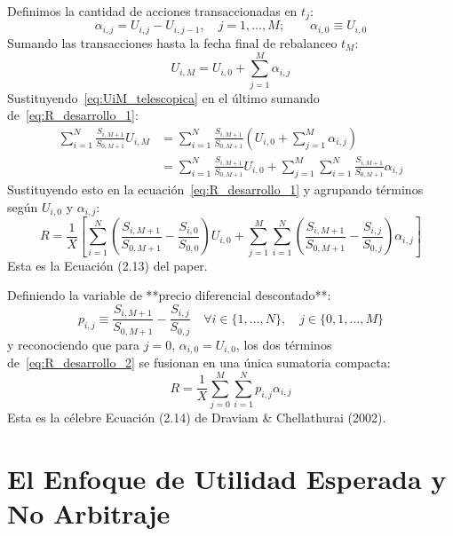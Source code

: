 \documentclass[11pt,a4paper]{report}
\numberwithin{equation}{chapter}
\begin{document}
\begin{demobox}
Definimos la cantidad de acciones transaccionadas en $t_j$:
\begin{equation}
    \alpha_{i,j} = U_{i,j} - U_{i,j-1}, \quad j = 1, \dots, M; \qquad \alpha_{i,0} \equiv U_{i,0}
\end{equation}
Sumando las transacciones hasta la fecha final de rebalanceo $t_M$:
\begin{equation}
    U_{i,M} = U_{i,0} + \sum_{j=1}^M \alpha_{i,j} \label{eq:UiM_telescopica}
\end{equation}
Sustituyendo~\eqref{eq:UiM_telescopica} en el último sumando de~\eqref{eq:R_desarrollo_1}:
\begin{align}
    \sum_{i=1}^N \frac{S_{i,M+1}}{S_{0,M+1}} U_{i,M} &= \sum_{i=1}^N \frac{S_{i,M+1}}{S_{0,M+1}} \left( U_{i,0} + \sum_{j=1}^M \alpha_{i,j} \right) \nonumber \\
    &= \sum_{i=1}^N \frac{S_{i,M+1}}{S_{0,M+1}} U_{i,0} + \sum_{j=1}^M \sum_{i=1}^N \frac{S_{i,M+1}}{S_{0,M+1}} \alpha_{i,j}
\end{align}
Sustituyendo esto en la ecuación~\eqref{eq:R_desarrollo_1} y agrupando términos según $U_{i,0}$ y $\alpha_{i,j}$:
\begin{equation}
    R = \frac{1}{X} \left[ \sum_{i=1}^N \left( \frac{S_{i,M+1}}{S_{0,M+1}} - \frac{S_{i,0}}{S_{0,0}} \right) U_{i,0} + \sum_{j=1}^M \sum_{i=1}^N \left( \frac{S_{i,M+1}}{S_{0,M+1}} - \frac{S_{i,j}}{S_{0,j}} \right) \alpha_{i,j} \right] \label{eq:R_desarrollo_2}
\end{equation}
Esta es la Ecuación (2.13) del paper.

Definiendo la variable de **precio diferencial descontado**:
\begin{equation}
    \boxed{p_{i,j} \equiv \frac{S_{i,M+1}}{S_{0,M+1}} - \frac{S_{i,j}}{S_{0,j}} \quad \forall i \in \{1, \dots, N\}, \quad j \in \{0, 1, \dots, M\}}
\end{equation}
y reconociendo que para $j=0$, $\alpha_{i,0} = U_{i,0}$, los dos términos de~\eqref{eq:R_desarrollo_2} se fusionan en una única sumatoria compacta:
\begin{equation}
    \boxed{R = \frac{1}{X} \sum_{j=0}^M \sum_{i=1}^N p_{i,j} \alpha_{i,j}}
\end{equation}
Esta es la célebre Ecuación (2.14) de Draviam \& Chellathurai (2002).
\end{demobox}

\section{El Enfoque de Utilidad Esperada y No Arbitraje}
\end{document}
